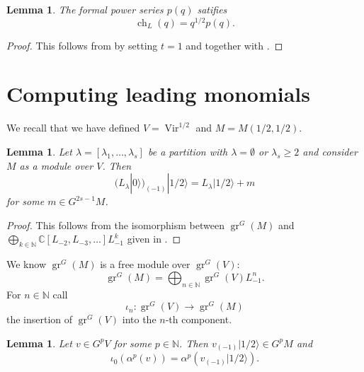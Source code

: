 \documentclass[12pt, a4paper]{article}
\newtheorem{lemma}[theorem]{Lemma}
\theoremstyle{remark}
\DeclareMathOperator{\Vir}{Vir}
\DeclareMathOperator{\gr}{gr}
\DeclareMathOperator{\ch}{ch}
\newcommand{\vac}{|0\rangle}
\newcommand{\vachalf}{|1/2\rangle}
\begin{document}
\begin{lemma}
  \label{lmm:6}
  The formal power series $p(q)$ satifies
  \begin{equation*}
    \ch_{L}(q) = q^{1/2}p(q).
  \end{equation*}
\end{lemma}

\begin{proof}
  This follows from  by setting $t = 1$ and \cite[Theorem 4]{andrews_singular_2022} together with .
\end{proof}

\section{Computing leading monomials}
\label{sec:comp-lead-monom}
We recall that we have defined $V = \Vir^{1/2}$ and $M = M(1/2, 1/2)$.
\begin{lemma}
  \label{lmm:8}
  Let $\lambda=[\lambda_1,\dots, \lambda_s]$ be a partition with $\lambda=\emptyset$ or $\lambda_s\ge 2$ and consider $M$ as a module over $V$.
  Then
  \begin{equation*}
    (L_\lambda\vac)_{(-1)}\vachalf=L_\lambda\vachalf+m
  \end{equation*}
  for some $m\in G^{2s-1}M$.
\end{lemma}
\begin{proof}
  This follows from the isomorphism between $\gr^G(M)$ and $\bigoplus_{k \in \mathbb{N}}\mathbb{C}[L_{-2}, L_{-3}, \dots]L_{-1}^k$ given in .
\end{proof}

We know $\gr^G(M)$ is a free module over $\gr^G(V)$:
\begin{equation*}
  \gr^G(M) = \bigoplus_{n\in \mathbb{N}}\gr^G(V)L_{-1}^n.
\end{equation*}
For $n\in \mathbb{N}$ call
\begin{equation*}
  \iota_n:\gr^G(V)\to\gr^G(M)
\end{equation*}
the insertion of $\gr^G(V)$ into the $n$-th component.

\begin{lemma}
  \label{lmm:9}
  Let $v \in G^pV$ for some $p \in \mathbb{N}$.
  Then $v_{(-1)}\vachalf \in G^pM$ and
  \begin{equation*}
    \iota_0(\alpha^p(v)) = \alpha^p(v_{(-1)}\vachalf).
  \end{equation*}
\end{lemma}
\end{document}
